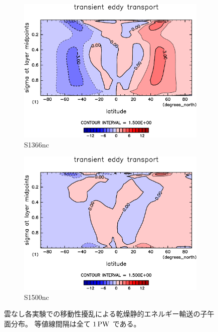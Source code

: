 \documentclass[body]{subfiles}
\begin{document}
\begin{figure}[t]
	\centering
	\begin{subfigure}{.4\textwidth}
		\centering
		\includegraphics[width=\columnwidth]{S1366-nc/MeriHeatTransTest@dryStatEn_TE,time=3650:4015-crop-rotate.pdf}
		\caption{S1366nc}\label{乾燥静的エネルギー移動性擾乱S1366nc}
	\end{subfigure}
	\begin{subfigure}{.4\textwidth}
		\centering
		\includegraphics[width=\columnwidth]{S1500-nc/MeriHeatTransTest@dryStatEn_TE,time=3650:4015-crop-rotate.pdf}
		\caption{S1500nc}\label{乾燥静的エネルギー移動性擾乱S1500nc}
	\end{subfigure}
	\caption[雲なし各実験での移動性擾乱に依る乾燥静的エネルギー輸送の子午面分布]{
		雲なし各実験での移動性擾乱による乾燥静的エネルギー輸送の子午面分布。
		等値線間隔は全て \(1\hmu{PW}\) である。
	}\label{乾燥静的エネルギー移動性擾乱nc}
\end{figure}
\end{document}
